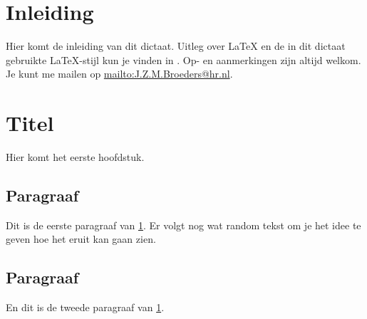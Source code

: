 
\newcommand{\myClass}{book}
\newcommand{\modulecode}{DIC10}
\newcommand{\titel}{Voorbeelddictaat}
\newcommand{\documenttype}{Dictaat}
\newcommand{\huidigeversie}{1.0}
\newcommand{\auteurs}{
    J.Z.M. Broeders
}


\usepackage{lipsum}


\frontmatter

\cleardoublepage
\setcounter{tocdepth}{4}
\setcounter{secnumdepth}{4}
\tableofcontents
\cleardoublepage

\mainmatter
\chapter*{Inleiding}
\label{sec:inleiding}

Hier komt de inleiding van dit dictaat.
Uitleg over \LaTeX{} en de in dit dictaat gebruikte \LaTeX{}-stijl kun je vinden in \cite{Broeders2017}.  
Op- en aanmerkingen zijn altijd welkom.
Je kunt me mailen op \url{mailto:J.Z.M.Broeders@hr.nl}.

\chapter{Titel}
\label{sec:h1}
Hier komt het eerste hoofdstuk.
\section{Paragraaf}
Dit is de eerste paragraaf van \cref{sec:h1}. 
Er volgt nog wat random tekst om je het idee te geven hoe het eruit kan gaan zien.

\lipsum[1-10]
\section{Paragraaf}
En dit is de tweede paragraaf van \cref{sec:h1}.

\printbibliography[heading=bibintoc]{}
\backmatter

